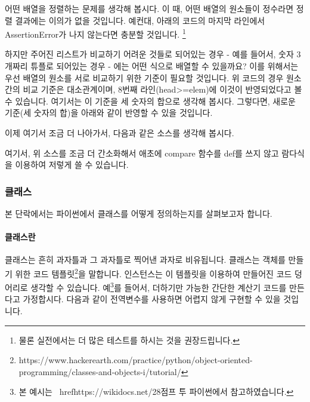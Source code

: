어떤 배열을 정렬하는 문제를 생각해 봅시다. 이 때, 어떤 배열의 원소들이 정수라면 정렬 결과에는 이의가 없을 것입니다. 예컨대, 아래의 코드의 마지막 라인에서 AssertionError가 나지 않는다면 충분할 것입니다. \footnote{물론 실전에서는 더 많은 테스트를 하시는 것을 권장드립니다.}





하지만 주어진 리스트가 비교하기 어려운 것들로 되어있는 경우 - 예를 들어서, 숫자 3개짜리 튜플로 되어있는 경우 - 에는 어떤 식으로 배열할 수 있을까요? 이를 위해서는 우선 배열의 원소를 서로 비교하기 위한 기준이 필요할 것입니다. 위 코드의 경우 원소간의 비교 기준은 대소관계이며, 8번째 라인(head>=elem)에 이것이 반영되었다고 볼 수 있습니다. 여기서는 이 기준을 세 숫자의 합으로 생각해 봅시다. 그렇다면, 새로운 기준(세 숫자의 합)을 아래와 같이 반영할 수 있을 것입니다. 




이제 여기서 조금 더 나아가서, 다음과 같은 소스를 생각해 봅시다. 



여기서, 위 소스를 조금 더 간소화해서 애초에 compare 함수를 def를 쓰지 않고 람다식을 이용하여 저렇게 쓸 수 있습니다. 



\subsubsection{클래스}

본 단락에서는 파이썬에서 클래스를 어떻게 정의하는지를 살펴보고자 합니다. 

\paragraph{클래스란} 

클래스는 흔히 과자틀과 그 과자틀로 찍어낸 과자로 비유됩니다.  클래스는 객체를 만들기 위한 코드 템플릿\footnote{https://www.hackerearth.com/practice/python/object-oriented-programming/classes-and-objects-i/tutorial/}을 말합니다. 인스턴스는 이 템플릿을 이용하여 만들어진 코드 덩어리로 생각할 수 있습니다. 예\footnote{본 예시는 \ href{https://wikidocs.net/28}{점프 투 파이썬}에서 참고하였습니다.}를 들어서, 더하기만 가능한 간단한 계산기 코드를 만든다고 가정합시다. 다음과 같이 전역변수를 사용하면 어렵지 않게 구현할 수 있을 것입니다. 

